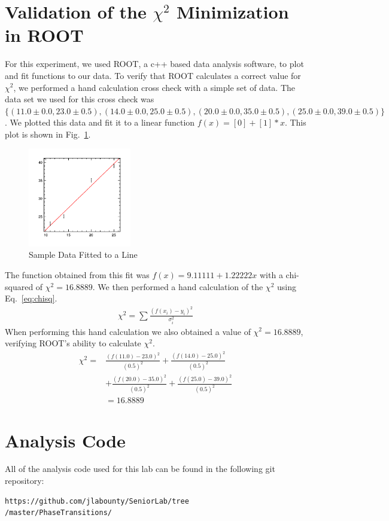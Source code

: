 \documentclass[%
 reprint,
 amsmath,amssymb,
 aps,
 pra,
]{revtex4-1}
\begin{document}
\begin{appendix}

\section{Validation of the $\chi^2$ Minimization in ROOT} \label{section:root}
For this experiment, we used ROOT, a c++ based data analysis software, to plot and fit functions to our data. To verify that ROOT calculates a correct value for $\chi^{2}$, we performed a hand calculation cross check with a simple set of data. The data set we used for this cross check was $\{ (11.0 \pm 0.0, 23.0 \pm 0.5), (14.0 \pm 0.0, 25.0 \pm 0.5), (20.0 \pm 0.0, 35.0 \pm 0.5), (25.0 \pm 0.0, 39.0 \pm 0.5) \}$. We plotted this data and fit it to a linear function $f(x) = [0] + [1]*x$. This plot is shown in Fig.~\ref{Fig:rootproof}.
\begin{figure}[H]
	\centering
	\includegraphics[width=0.4\textwidth]{rootproof.png}
	\caption{Sample Data Fitted to a Line}
	\label{Fig:rootproof}
\end{figure}
The function obtained from this fit was $f(x) = 9.11111 + 1.22222x$ with a chi-squared of $\chi ^{2} = 16.8889$. We then performed a hand calculation of the $\chi ^{2}$ using Eq.~\ref{eq:chisq}.
\begin{gather}\label{eq:chisq}
\chi ^{2} = \sum \frac{(f(x_i) - y_i)^{2}}{\sigma_i^2}
\end{gather}
When performing this hand calculation we also obtained a value of $\chi ^{2} = 16.8889$, verifying ROOT's ability to calculate $\chi ^{2}$.
\begin{align*}
\chi ^{2} =& \frac{(f(11.0) - 23.0)^{2}}{(0.5)^2} + \frac{(f(14.0) - 25.0)^{2}}{(0.5)^2} \\
&+ \frac{(f(20.0) - 35.0)^2}{(0.5)^2} + \frac{(f(25.0) - 39.0)^{2}}{(0.5)^2} \\
&= 16.8889
\end{align*}

\section{Analysis Code} \label{section:analysis_code}
All of the analysis code used for this lab can be found in the following git repository: 
\begin{verbatim}
https://github.com/jlabounty/SeniorLab/tree
/master/PhaseTransitions/
\end{verbatim}

\end{appendix}
\end{document}
